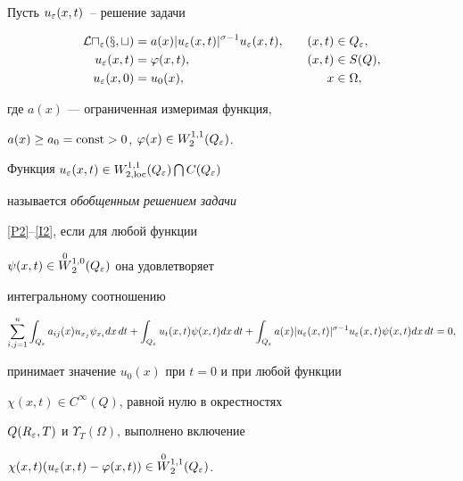Пусть $u_\varepsilon(x,t)$~-- решение задачи


\begin{alignat}{2}


\cal{L}u_\eps(x,t)&=a(x)|u_\eps(x,t)|^{\sigma-1}u_\eps(x,t),


&\quad (x,t)&\in Q_\eps, \label{P2}\\


%


u_\eps(x,t)&=\varphi(x,t), &\quad (x,t)&\in S(Q), \label{B2}\\


%


u_\eps(x,0)&=u_0(x), &\quad x&\in\Omega, \label{I2}


\end{alignat}


где $a(x)$ --- ограниченная измеримая функция,


$a(x)\ge a_0=\operatorname{const}>0$, $\varphi(x)\in W_{2}^{1,1}(Q_\varepsilon)$.








\begin{defn}


Функция $u_\varepsilon(x,t)\in W^{1,1}_{2,\operatorname{loc}}(Q_\varepsilon)\bigcap C(Q_\varepsilon)$


называется {\it обобщенным решением задачи}


\eqref{P2}--\eqref{I2}, если для любой функции


$\psi(x,t)\in \overset{0}{W}{}_{2}^{1,0}(Q_\varepsilon)$ она удовлетворяет


интегральному соотношению


$$


\stdsum\int_{Q_\eps} a_{ij}(x) u_{x_j} \psi_{x_i}


dx\,dt+\int_{Q_\eps}


u_t(x,t)\psi(x,t)dx\,dt+\int_{Q_\eps}


a(x)|u_\eps(x,t)|^{\sigma-1}u_\eps(x,t)\psi(x,t)dx\,dt=0,


$$


принимает значение $u_0(x)$ при $t=0$ и при любой функции


$\chi(x,t)\in C^\infty(Q)$, равной нулю в окрестностях


$Q(R_\varepsilon,T)$ и $\Upsilon_T(\Omega)$, выполнено включение


$\chi(x,t)(u_\varepsilon(x,t)-\varphi(x,t))\in\overset{0}{W}{}_2^{1,1}(Q_\varepsilon)$.


\end{defn}





